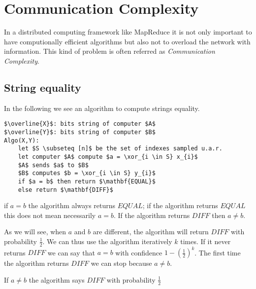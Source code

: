 \chapter{Communication Complexity}\label{ch:comm-complex}

In a distributed computing framework like MapReduce it is not only important to have computionally efficient algorithms but also not to overload the network with information. This kind of problem is often referred as \emph{Communication Complexity}.

\section{String equality}\label{sec:string-eq}
In the following we see an algorithm to compute strings equality.

\begin{lstlisting}[caption={Greedy algorithm},label={lst:fS-greedycc}]
$\overline{X}$: bits string of computer $A$
$\overline{Y}$: bits string of computer $B$
Algo(X,Y):
    let $S \subseteq [n]$ be the set of indexes sampled u.a.r.
    let computer $A$ compute $a = \xor_{i \in S} x_{i}$
    $A$ sends $a$ to $B$
    $B$ computes $b = \xor_{i \in S} y_{i}$
    if $a = b$ then return $\mathbf{EQUAL}$
    else return $\mathbf{DIFF}$
\end{lstlisting}

\begin{obs}
if $a = b$ the algorithm always returns $EQUAL$; if the algorithm returns $EQUAL$ this does not mean necessarily $a = b$. If the algorithm returns $DIFF$ then $a \neq b$.
\end{obs}

As we will see, when $a$ and $b$ are different, the algorithm will return $DIFF$ with probability $\frac{1}{2}$.
We can thus use the algorithm iteratively $k$ times. If it never returns $DIFF$ we can say that $a = b$ with confidence $1 - (\frac{1}{2})^k$. The first time the algorithm returns $DIFF$ we can stop because $a \neq b$.

\begin{thm}
    If $a \neq b$ the algorithm says $DIFF$ with probability $\frac{1}{2}$
\end{thm}

